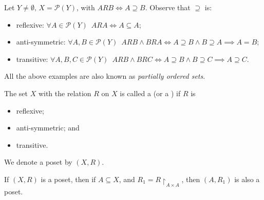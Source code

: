 \documentclass[notoc,notitlepage]{tufte-book}
\begin{document}
\begin{eg}
  Let $Y \neq \emptyset, \, X = \mathcal{P}(Y)$, with $ARB \iff A \supseteq B$. Observe that $\supseteq$ is:
  \begin{itemize}
    \item reflexive: $\forall A \in \mathcal{P}(Y) \enspace ARA \iff A \subseteq A$;
    \item anti-symmetric: $\forall A, B \in \mathcal{P}(Y) \enspace ARB \land BRA \iff A \supseteq B \land B \supseteq A \implies A = B$;
    \item transitive: $\forall A, B, C \in \mathcal{P}(Y) \enspace ARB \land BRC \iff A \supseteq B \land B \supseteq C \implies A \supseteq C$.
  \end{itemize}
\end{eg}

All the above examples are also known as \textit{partially ordered sets}.

\begin{defn}\label{defn:partially_ordered_sets}
The set $X$ with the relation $R$ on $X$ is called a  (or a ) if $R$ is
  \begin{itemize}
    \item reflexive;
    \item anti-symmetric; and
    \item transitive.
  \end{itemize}
  We denote a poset by $(X, R)$.
\end{defn}

\begin{note}
  If $(X, R)$ is a poset, then if $A \subseteq X$, and $R_1 = R \restriction_{A \times A}$, then $(A, R_1)$ is also a poset.
\end{note}
\end{document}
